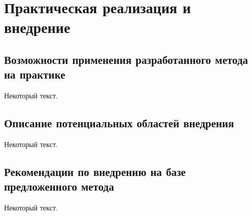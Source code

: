 \chapter{Практическая реализация и внедрение}\label{ch:ch5}

\section{Возможности применения разработанного метода на практике}\label{sec:ch5/sec1}

Некоторый текст.

\section{Описание потенциальных областей внедрения}\label{sec:ch5/sec2}

Некоторый текст.

\section{Рекомендации по внедрению на базе предложенного метода}\label{sec:ch5/sec3}

Некоторый текст.

\FloatBarrier